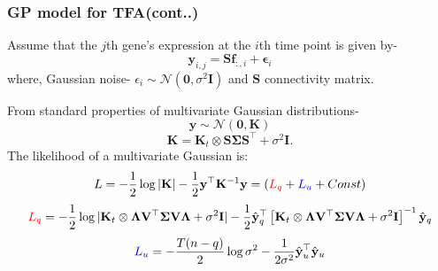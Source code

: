 \documentclass{beamer}
\begin{document}
\begin{frame}
\frametitle{GP model for TFA(cont..)}

Assume that the $j$th gene's expression at the $i$th time point is given by-
\begin{equation} \label{eq:yij}
  \mathbf{y}_{i, j} = \mathbf{S}\mathbf{f}_{:, i} + \boldsymbol{\epsilon}_i
\end{equation}  
where, Gaussian noise- $\epsilon_i \sim \mathcal{N}(\mathbf{0}, \sigma^2 \mathbf{I})$ and $\mathbf{S}$ connectivity matrix.

From standard properties of multivariate Gaussian distributions-
\begin{equation} \label{eq:mGPd}
\mathbf{y} \sim \mathcal{N}(\mathbf{0}, \mathbf{K})
\end{equation}
\begin{equation} \label{eq:K}
\mathbf{K} = \mathbf{K}_t \otimes \mathbf{S} \boldsymbol{\Sigma} \mathbf{S}^\top + \sigma^2 \mathbf{I}.
\end{equation}
The likelihood of a multivariate Gaussian is:
\begin{equation} \label{eq:Likelihood}
L = -\frac{1}{2} \log |\mathbf{K}| - \frac{1}{2} \mathbf{y}^\top \mathbf{K}^{-1} \mathbf{y} =({\color{red}L_q}+{\color{blue}L_u}+Const)
\end{equation}
\begin{equation} \label{eq:Lq}
{\color{red}L_q} = -\frac{1}{2} \log |\mathbf{K}_t\otimes
	  \boldsymbol{\Lambda}\mathbf{V}^\top\boldsymbol{\Sigma}\mathbf{V}\boldsymbol{\Lambda}+\sigma^2\mathbf{I}| 
	- \frac{1}{2} \hat{\mathbf{y}}_q^\top \left[\mathbf{K}_t\otimes 
	  \boldsymbol{\Lambda}\mathbf{V}^\top\boldsymbol{\Sigma}\mathbf{V}\boldsymbol{\Lambda}+\sigma^2\mathbf{I}\right]^{-1} \hat{\mathbf{y}}_q
\end{equation}
\begin{equation} \label{eq:Lu}
{\color{blue}L_u} = -\frac{T(n-q)}{2} \log \sigma^2  -\frac{1}{2\sigma^2} \hat{\mathbf{y}}_u^\top \hat{\mathbf{y}}_u
\end{equation}

\end{frame}
\end{document}
